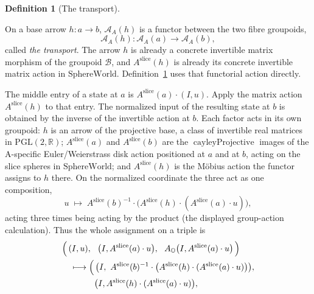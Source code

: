 \documentclass[11pt]{article}
\newcommand{\OO}{\mathbb{O}}
\newcommand{\RR}{\mathbb{R}}
\providecommand{\SphereWorld}{\mathrm{SphereWorld}}
\providecommand{\lean}[1]{}
\providecommand{\notready}{}
\providecommand{\uses}[1]{}
\theoremstyle{plain}
\theoremstyle{definition}
\newtheorem{definition}[theorem]{Definition}
\theoremstyle{remark}
\begin{document}
\begin{definition}[The transport]\label{def:transport}
\lean{ASection.AsectionActionTransport,
ASection.AsectionActionTransport_obj_input,
ASection.AsectionActionTransport_obj_positioned,
ASection.AsectionActionTransport_obj_value}
\notready
\uses{def:states, prop:aslice-functor}
On a base arrow $h:a\to b$, $\mathcal A_A(h)$ is a functor between the
two fibre groupoids,
\[
  \mathcal A_A(h):\mathcal A_A(a)\longrightarrow\mathcal A_A(b),
\]
called \emph{the transport}.  The arrow $h$ is already a concrete
invertible matrix morphism of the groupoid $\mathcal B$, and
$A^{\mathrm{slice}}(h)$ is already its concrete invertible matrix action
in $\SphereWorld$.  Definition~\ref{def:transport} uses that functorial
action directly.

The middle entry of a state at $a$ is
$A^{\mathrm{slice}}(a)\cdot(I,u)$.  Apply the matrix action
$A^{\mathrm{slice}}(h)$ to that entry.  The normalized input of the
resulting state at $b$ is obtained by the inverse of the invertible action
at $b$.  Each factor acts in its own groupoid: $h$ is an arrow of the
projective base, a class of invertible real matrices in
$\mathrm{PGL}(2,\RR)$; $A^{\mathrm{slice}}(a)$ and $A^{\mathrm{slice}}(b)$
are the $\operatorname{cayleyProjective}$ images of the A-specific
Euler/Weierstrass disk action positioned at $a$ and at $b$, acting on the
slice spheres in $\SphereWorld$; and $A^{\mathrm{slice}}(h)$ is the
M\"obius action the functor assigns to $h$ there.  On the normalized
coordinate the three act as one composition,
\[
  u\;\longmapsto\;
  A^{\mathrm{slice}}(b)^{-1}\mathbin{\cdot}
  \bigl(A^{\mathrm{slice}}(h)\mathbin{\cdot}
  (A^{\mathrm{slice}}(a)\mathbin{\cdot}u)\bigr),
\]
acting three times being acting by the product (the displayed
group-action calculation).  Thus the whole assignment on a triple is
\[
\begin{aligned}
  &\Bigl(\,(I,u),\ \
    \bigl(I,A^{\mathrm{slice}}(a)\cdot u\bigr),\ \
    A_{\OO}\bigl(I,A^{\mathrm{slice}}(a)\cdot u\bigr)\,\Bigr)\\
  &\quad\longmapsto
  \Bigl(\,\bigl(I,\
      A^{\mathrm{slice}}(b)^{-1}\mathbin{\cdot}
      \bigl(A^{\mathrm{slice}}(h)\mathbin{\cdot}
      (A^{\mathrm{slice}}(a)\mathbin{\cdot}u)\bigr)\bigr),\\
  &\hspace{3.8em}
    \bigl(I,A^{\mathrm{slice}}(h)\mathbin{\cdot}
      (A^{\mathrm{slice}}(a)\mathbin{\cdot}u)\bigr),\\
  &\hspace{3.8em}

\end{aligned}\]
\end{definition}
\end{document}

